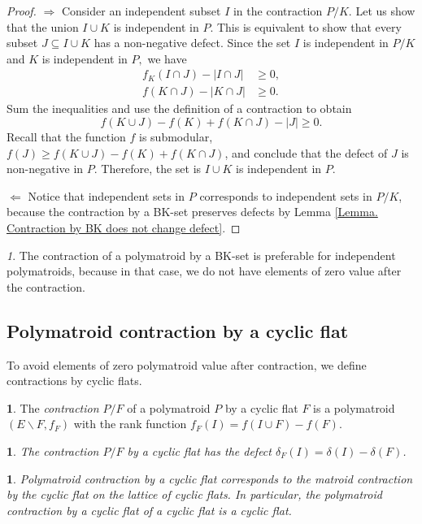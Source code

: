 \documentclass[11pt]{article}
\theoremstyle{plain}
\theoremstyle{definition}
\newtheorem{defn}[thm]{\protect\definitionname}
\theoremstyle{remark}
\newtheorem{rem}[thm]{\protect\remarkname}
\theoremstyle{plain}
\newtheorem{lem}[thm]{\protect\lemmaname}
\theoremstyle{plain}
\theoremstyle{plain}
\theoremstyle{definition}
\providecommand{\definitionname}{Definition}
\providecommand{\lemmaname}{Lemma}
\providecommand{\remarkname}{Remark}
\begin{document}
\begin{proof}
$\boxed{\Rightarrow}$ Consider an independent subset $I$ in the
contraction $P/K$. Let us show that the union $I\cup K$ is independent
in $P$. This is equivalent to show that every subset $J\subseteq I\cup K$
has a non-negative defect. Since the set $I$ is independent in $P/K$
and $K$ is independent in $P,$ we have 
\begin{align*}
f_{K}(I\cap J)-|I\cap J| & \geq0,\\
f(K\cap J)-|K\cap J| & \geq0.
\end{align*}
Sum the inequalities and use the definition of a contraction to obtain
\[
f(K\cup J)-f(K)+f(K\cap J)-|J|\geq0.
\]
Recall that the function $f$ is submodular, $f(J)\geq f(K\cup J)-f(K)+f(K\cap J)$,
and conclude that the defect of $J$ is non-negative in $P$. Therefore,
the set is $I\cup K$ is independent in $P$.

$\boxed{\Leftarrow}$ Notice that independent sets in $P$ corresponds
to independent sets in $P/K$, because the contraction by a BK-set
preserves defects by Lemma \ref{Lemma. Contraction by BK does not change defect}.
\end{proof}
\begin{rem}
The contraction of a polymatroid by a BK-set is preferable for independent
polymatroids, because in that case, we do not have elements of zero
value after the contraction.
\end{rem}


\subsection{Polymatroid contraction by a cyclic flat}

To avoid elements of zero polymatroid value after contraction, we
define contractions by cyclic flats.
\begin{defn}
The \textit{contraction $P/F$} of a polymatroid $P$ by a cyclic
flat $F$ is a polymatroid $(E\backslash F,f_{F})$ with the rank
function $f_{F}(I)=f(I\cup F)-f(F).$
\end{defn}

\begin{lem}
\label{Lemma. Defect of a contraction by a cyclic flat}The contraction
$P/F$ by a cyclic flat has the defect $\delta_{F}(I)=\delta(I)-\delta(F)$.
\end{lem}

\begin{lem}
\label{Lemma. Contraction of a cyclic flat is cyclic flat}Polymatroid
contraction by a cyclic flat corresponds to the matroid contraction
by the cyclic flat on the lattice of cyclic flats. In particular,
the polymatroid contraction by a cyclic flat of a cyclic flat is a
cyclic flat.
\end{lem}
\end{document}
